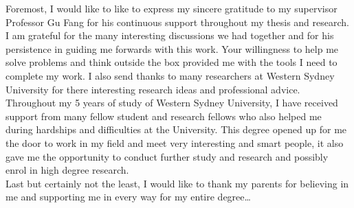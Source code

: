\documentclass[
12pt, %
english, %
onehalfspacing, %
headsepline, %
]{MastersDoctoralThesis} %
\begin{document}
\begin{acknowledgements}
\addchaptertocentry{\acknowledgementname} %
\hspace{5mm} Foremost, I would like to like to express my sincere gratitude to my supervisor Professor Gu Fang for his continuous support throughout my thesis and research. I am grateful for the many interesting discussions we had together and for his persistence in guiding me forwards with this work. Your willingness to help me solve problems and think outside the box provided me with the tools I need to complete my work. I also send thanks to many researchers at Western Sydney University for there interesting research ideas and professional advice.\\

Throughout my 5 years of study of Western Sydney University, I have received support from many fellow student and research fellows who also helped me during hardships and difficulties at the University. This degree opened up for me the door to work in my field and meet very interesting and smart people, it also gave me the opportunity to conduct further study and research and possibly enrol in high degree research.\\

Last but certainly not the least, I would like to thank my parents for believing in me and supporting me in every way for my entire degree\ldots
\end{acknowledgements}


\tableofcontents %

\listoffigures %

\listoftables %

\end{document}

